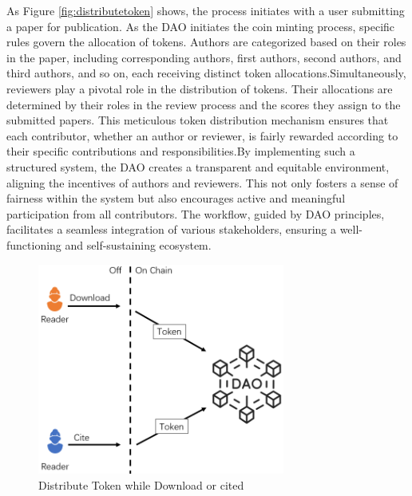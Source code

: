 \documentclass[lettersize,journal]{IEEEtran}
\begin{document}
As Figure \ref{fig:distributetoken} shows, the process initiates with a user submitting a paper for publication. As the DAO initiates the coin minting process, specific rules govern the allocation of tokens. Authors are categorized based on their roles in the paper, including corresponding authors, first authors, second authors, and third authors, and so on, each receiving distinct token allocations.Simultaneously, reviewers play a pivotal role in the distribution of tokens. Their allocations are determined by their roles in the review process and the scores they assign to the submitted papers. This meticulous token distribution mechanism ensures that each contributor, whether an author or reviewer, is fairly rewarded according to their specific contributions and responsibilities.By implementing such a structured system, the DAO creates a transparent and equitable environment, aligning the incentives of authors and reviewers. This not only fosters a sense of fairness within the system but also encourages active and meaningful participation from all contributors. The workflow, guided by DAO principles, facilitates a seamless integration of various stakeholders, ensuring a well-functioning and self-sustaining ecosystem.

\begin{figure}[h]
  \centering
  \includegraphics[width=3.2in]{assets/addtoken.png}
  \caption{Distribute Token while Download or cited}
  \label{fig:addtoken}
\end{figure}
\end{document}
